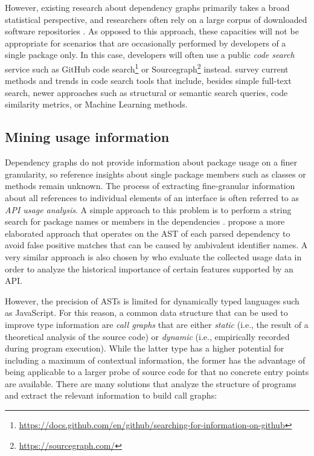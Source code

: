 However, existing research about dependency graphs primarily takes a broad statistical perspective, and researchers often rely on a large corpus of downloaded software repositories \citep{abdalkareem2017developers,katz2020libraries,kikas2017structure}.
As opposed to this approach, these capacities will not be appropriate for scenarios that are occasionally performed by developers of a single package only.
In this case, developers will often use a public \emph{code search} service such as GitHub code search\footnote{\url{https://docs.github.com/en/github/searching-for-information-on-github}} or Sourcegraph\footnote{\url{https://sourcegraph.com/}} instead.
\citet{liu2020opportunities} survey current methods and trends in code search tools that include, besides simple full-text search, newer approaches such as structural or semantic search queries, code similarity metrics, or Machine Learning methods.

\subsection{Mining usage information}

Dependency graphs do not provide information about package usage on a finer granularity, so reference insights about single package members such as classes or methods remain unknown.
The process of extracting fine-granular information about all references to individual elements of an interface is often referred to as \emph{API usage analysis}.
A simple approach to this problem is to perform a string search for package names or members in the dependencies \citep{mileva2010mining}.
\citet{qiu2016understanding} propose a more elaborated approach that operates on the AST of each parsed dependency to avoid false positive matches that can be caused by ambivalent identifier names.
A very similar approach is also chosen by \citet{sawant2017fine} who evaluate the collected usage data in order to analyze the historical importance of certain features supported by an API.

However, the precision of ASTs is limited for dynamically typed languages such as JavaScript.
For this reason, a common data structure that can be used to improve type information are \emph{call graphs} that are either \emph{static} (i.e., the result of a theoretical analysis of the source code) or \emph{dynamic} (i.e., empirically recorded during program execution).
While the latter type has a higher potential for including a maximum of contextual information, the former has the advantage of being applicable to a larger probe of source code for that no concrete entry points are available.
There are many solutions that analyze the structure of programs and extract the relevant information to build call graphs:

